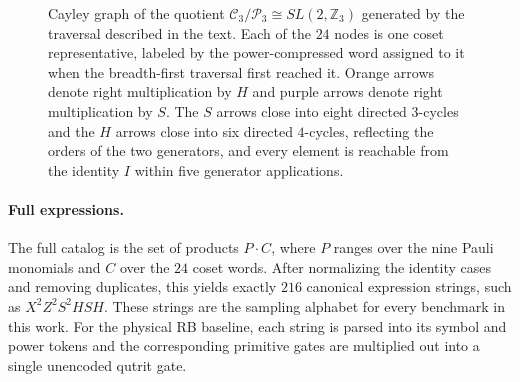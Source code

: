 \begin{figure}[H]
{
  }
  \caption{Cayley graph of the quotient $\mathcal{C}_3/\mathcal{P}_3 \cong SL(2,\mathbb{Z}_3)$ generated by the traversal described in the text. Each of the $24$ nodes is one coset representative, labeled by the power-compressed word assigned to it when the breadth-first traversal first reached it. Orange arrows denote right multiplication by $H$ and purple arrows denote right multiplication by $S$. The $S$ arrows close into eight directed $3$-cycles and the $H$ arrows close into six directed $4$-cycles, reflecting the orders of the two generators, and every element is reachable from the identity $I$ within five generator applications.}
  \label{fig:cayley-c3modp3}
\end{figure}


\paragraph{Full expressions.}
The full catalog is the set of products $P \cdot C$, where $P$ ranges over the nine Pauli monomials and $C$ over the $24$ coset words. After normalizing the identity cases and removing duplicates, this yields exactly $216$ canonical expression strings, such as $X^2Z^2S^2HSH$. These strings are the sampling alphabet for every benchmark in this work. For the physical RB baseline, each string is parsed into its symbol and power tokens and the corresponding primitive gates are multiplied out into a single unencoded qutrit gate.

